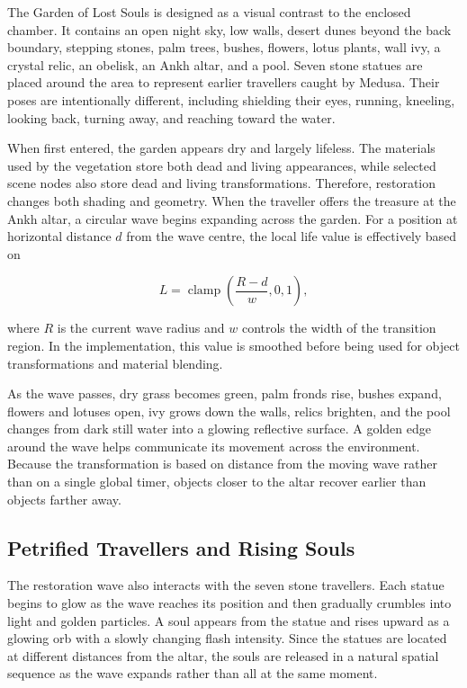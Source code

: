 \documentclass[11pt,a4paper]{article}
\begin{document}
The Garden of Lost Souls is designed as a visual contrast to the enclosed
chamber. It contains an open night sky, low walls, desert dunes beyond the back
boundary, stepping stones, palm trees, bushes, flowers, lotus plants, wall ivy,
a crystal relic, an obelisk, an Ankh altar, and a pool. Seven stone statues are
placed around the area to represent earlier travellers caught by Medusa. Their
poses are intentionally different, including shielding their eyes, running,
kneeling, looking back, turning away, and reaching toward the water.

When first entered, the garden appears dry and largely lifeless. The materials
used by the vegetation store both dead and living appearances, while selected
scene nodes also store dead and living transformations. Therefore, restoration
changes both shading and geometry. When the traveller offers the treasure at
the Ankh altar, a circular wave begins expanding across the garden. For a
position at horizontal distance $d$ from the wave centre, the local life value
is effectively based on

\begin{equation}
    L =
    \operatorname{clamp}
    \left(
    \frac{R-d}{w},
    0,1
    \right),
\end{equation}

where $R$ is the current wave radius and $w$ controls the width of the
transition region. In the implementation, this value is smoothed before being
used for object transformations and material blending.

As the wave passes, dry grass becomes green, palm fronds rise, bushes expand,
flowers and lotuses open, ivy grows down the walls, relics brighten, and the
pool changes from dark still water into a glowing reflective surface. A golden
edge around the wave helps communicate its movement across the environment.
Because the transformation is based on distance from the moving wave rather
than on a single global timer, objects closer to the altar recover earlier than
objects farther away.

\subsection{Petrified Travellers and Rising Souls}

The restoration wave also interacts with the seven stone travellers. Each
statue begins to glow as the wave reaches its position and then gradually
crumbles into light and golden particles. A soul appears from the statue and
rises upward as a glowing orb with a slowly changing flash intensity. Since the
statues are located at different distances from the altar, the souls are
released in a natural spatial sequence as the wave expands rather than all at
the same moment.
\end{document}
